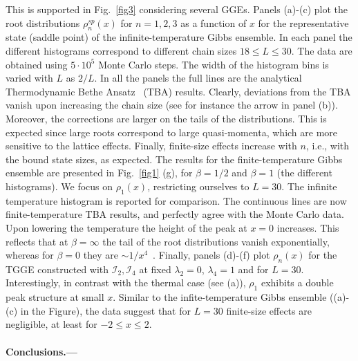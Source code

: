 \documentclass[twocolumn,superscriptaddress,prb,10pt]{revtex4-1}
\begin{document}
This is supported in Fig.~\ref{fig3} considering several GGEs. Panels (a)-(c) plot the  
root distributions $\rho^{sp}_n(x)$ for $n=1,2,3$ as a function of $x$ for the representative 
state (saddle point) of the infinite-temperature Gibbs ensemble. In each panel 
the different histograms correspond to different chain sizes $18\le L\le 30$. The data 
are obtained using $5\cdot 10^5$ Monte Carlo steps. The width of the histogram bins is 
varied with $L$ as $2/L$. In all the panels the full lines are the analytical   
Thermodynamic Bethe Ansatz~\cite{taka-book} (TBA) results. Clearly, deviations from 
the TBA vanish upon increasing the chain size (see for instance the arrow in panel (b)). 
Moreover, the corrections are larger on the tails of the distributions. This is expected 
since large roots correspond to large quasi-momenta, which are more sensitive to the 
lattice effects. Finally, finite-size effects increase with $n$, i.e., with the bound 
state sizes, as expected. The results for the finite-temperature Gibbs ensemble 
are presented in Fig.~\ref{fig1} (g), for $\beta=1/2$ and $\beta=1$ (the different 
histograms). We focus on $\rho_1(x)$, restricting ourselves to $L=30$. The 
infinite temperature histogram is reported for comparison. The continuous lines are now 
finite-temperature TBA results, and perfectly agree with the Monte Carlo data. 
Upon lowering the temperature the height of the peak at $x=0$ increases. This reflects 
that at $\beta=\infty$ the tail of the root distributions vanish exponentially, whereas 
for $\beta=0$ they are $\sim 1/x^4$~\cite{taka-book}. 
Finally, panels (d)-(f) plot $\rho_n(x)$ for the TGGE constructed with ${\mathcal I}_2,
{\mathcal I}_4$ at fixed  $\lambda_2=0$, $\lambda_4=1$ and for $L=30$. Interestingly, 
in contrast with the thermal case (see (a)), $\rho_1$ exhibits a double peak 
structure at small $x$. Similar to the infite-temperature Gibbs ensemble ((a)-(c) in 
the Figure), the data suggest that for $L=30$ finite-size effects are negligible, 
at least for $-2\le x\le 2$. 


\paragraph*{Conclusions.---}
\end{document}
